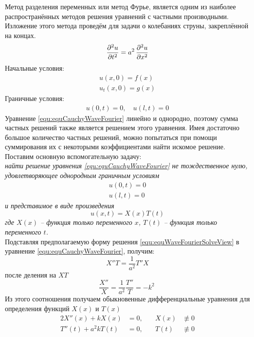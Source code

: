 \setcounter{equation}{0}
Метод разделения переменных или метод Фурье, является одним из наиболее распространённых методов решения уравнений с частными производными. Изложение этого метода проведём для задачи о колебаниях струны, закреплённой на концах.\\
\begin{equation}
	\frac{\partial^{2}u}{\partial t^{2}} = a^2\, \frac{\partial^{2}u}{\partial x^{2}}
	\label{equ:equCauchyWaveFourier}
\end{equation}
Начальные условия: 
\begin{align}
	u(x, 0) = f(x)\\
	u_t(x, 0) = g (x)
	\label{equ:equCauchyWaveFourierN}
\end{align}
Граничные условия:
\begin{align}
	u(0, t) = 0, \quad u(l, t) = 0
	\label{equ:equCauchyWaveFourierGr}
\end{align}
Уравнение \eqref{equ:equCauchyWaveFourier} линейно и однородно, поэтому сумма частных решений также является решением этого уравнения. Имея достаточно большое количество частных решений, можно попытаться при помощи суммирования их с некоторыми коэффициентами найти искомое решение. \\

Поставим основную вспомогательную задачу:\\
\textit{найти решение уравнения \eqref{equ:equCauchyWaveFourier} не тождественное нулю, удовлетворяющее однородным граничным условиям}
\begin{align*}
		u(0, t) = 0\\
		u(l, t) = 0
\end{align*}
\textit{и представимое в виде произведения }
\begin{equation}
	u(x,t)= X(x) T(t)
	\label{equ:equWaveFourierSolveView}
\end{equation}
\textit{где $X(x)$ -- функция только переменного $x$, $T(t)$ -- функция только переменного $t$.}\\

Подставляя предполагаемую форму решения \eqref{equ:equWaveFourierSolveView} в уравнение \eqref{equ:equCauchyWaveFourier}, получим:
\[
	X''T = \frac{1}{a^2} T''X
\]
после деления на $XT$
\[
	\frac{X''}{X} = \frac{1}{a^2} \frac{T''}{T} = - k^2\
\]
Из этого соотношения получаем обыкновенные дифференциальные уравнения для определения функций $X(x)$ и $T(x)$
\begin{alignat}{2} \label{equ:equCauchy1}
	X''(x) + k X(x) &= 0, \quad &X(x) &\not\equiv 0\\
	T''(t) + a^2 k T(t) &= 0, \quad &T(t) &\not\equiv 0
	\label{equ:equCauchy2}
\end{alignat}


